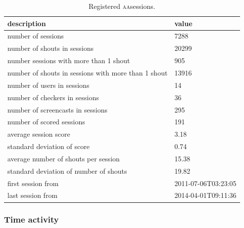 \documentclass[a4paper, 11pt]{article} %
\newcommand{\aab}{\textsc{aa}}
\begin{document}
\begin{table}[!h]
  \centering
  \caption{Registered \aab sessions.}\label{tab:session}
  \begin{tabular}{|l|l|}\hline
      {\bf description} & {\bf value}   \\\hline\hline
      number of sessions & 7288 \\ \hline
      number of shouts in sessions & 20299 \\ \hline
      number sessions with more than 1 shout & 905 \\ \hline
      number of shouts in sessions with more than 1 shout & 13916 \\ \hline
      number of users in sessions & 14 \\ \hline
      number of checkers in sessions & 36 \\ \hline
      number of screencasts in sessions & 295 \\ \hline
      number of scored sessions & 191 \\ \hline
      average session score & 3.18 \\ \hline
      standard deviation of score & 0.74 \\ \hline
      average number of shouts per session & 15.38 \\ \hline
      standard deviation of number of shouts & 19.82 \\ \hline
      first session from & 2011-07-06T03:23:05 \\ \hline
      last session from & 2014-04-01T09:11:36 \\ \hline

  \end{tabular}
\end{table}


\subsubsection{Time activity}
\end{document}
